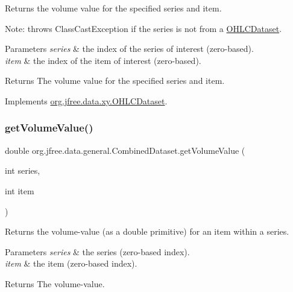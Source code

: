 Returns the volume value for the specified series and item. 

Note\+: throws {\ttfamily Class\+Cast\+Exception} if the series is not from a \mbox{\hyperlink{}{O\+H\+L\+C\+Dataset}}.


\begin{DoxyParams}{Parameters}
{\em series} & the index of the series of interest (zero-\/based). \\
\hline
{\em item} & the index of the item of interest (zero-\/based).\\
\hline
\end{DoxyParams}
\begin{DoxyReturn}{Returns}
The volume value for the specified series and item. 
\end{DoxyReturn}


Implements \mbox{\hyperlink{interfaceorg_1_1jfree_1_1data_1_1xy_1_1_o_h_l_c_dataset_a05012f783f010c1a62873a0c40e7b7fa}{org.\+jfree.\+data.\+xy.\+O\+H\+L\+C\+Dataset}}.

\mbox{\label{classorg_1_1jfree_1_1data_1_1general_1_1_combined_dataset_a8d5839a8b62e420e5f7cab7106440a19}} 
\subsubsection{\texorpdfstring{get\+Volume\+Value()}{getVolumeValue()}}
{\footnotesize\ttfamily double org.\+jfree.\+data.\+general.\+Combined\+Dataset.\+get\+Volume\+Value (\begin{DoxyParamCaption}\item[{int}]{series,  }\item[{int}]{item }\end{DoxyParamCaption})}

Returns the volume-\/value (as a double primitive) for an item within a series.


\begin{DoxyParams}{Parameters}
{\em series} & the series (zero-\/based index). \\
\hline
{\em item} & the item (zero-\/based index).\\
\hline
\end{DoxyParams}
\begin{DoxyReturn}{Returns}
The volume-\/value. 
\end{DoxyReturn}


